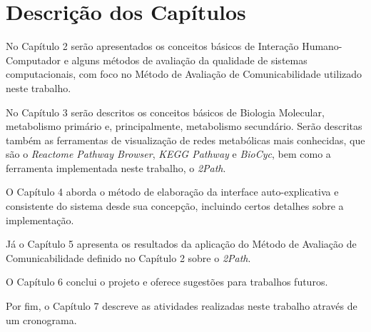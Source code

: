 \section{Descrição dos Capítulos}
\indent No Capítulo 2 serão apresentados os conceitos básicos de Interação Humano-Computador e alguns métodos de avaliação da qualidade de sistemas computacionais, com foco no Método de Avaliação de Comunicabilidade utilizado neste trabalho.

\indent No Capítulo 3 serão descritos os conceitos básicos de Biologia Molecular, metabolismo primário e, principalmente, metabolismo secundário. Serão descritas também as ferramentas de visualização de redes metabólicas mais conhecidas, que são o \textit{Reactome Pathway Browser}, \textit{KEGG Pathway} e \textit{BioCyc}, bem como a ferramenta implementada neste trabalho, o \textit{2Path}.

\indent O Capítulo 4 aborda o método de elaboração da interface auto-explicativa e consistente do sistema desde sua concepção, incluindo certos detalhes sobre a implementação.

\indent Já o Capítulo 5 apresenta os resultados da aplicação do Método de Avaliação de Comunicabilidade definido no Capítulo 2 sobre o \textit{2Path}.

\indent O Capítulo 6  conclui o projeto e oferece sugestões para trabalhos futuros.

\indent Por fim, o Capítulo 7 descreve as atividades realizadas neste trabalho através de um cronograma.